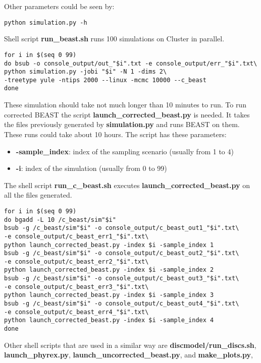 Other parameters could be seen by:

\begin{verbatim}
python simulation.py -h
\end{verbatim}


Shell script \textbf{run\_beast.sh} runs 100 simulations on Cluster in parallel.
\begin{verbatim}
for i in $(seq 0 99)
do bsub -o console_output/out_"$i".txt -e console_output/err_"$i".txt\
python simulation.py -jobi "$i" -N 1 -dims 2\
-treetype yule -ntips 2000 --linux -mcmc 10000 --c_beast
done
\end{verbatim}


These simulation should take not much longer than 10 minutes to run. To run corrected BEAST the script \textbf{launch\_corrected\_beast.py} is needed. It takes the files previously generated by \textbf{simulation.py} and runs BEAST on them. These runs could take about 10 hours. The script has these parameters:

\begin{itemize}
\item \textbf{-sample\_index}: index of the sampling scenario (usually from 1 to 4)
\item \textbf{-i}: index of the simulation (usually from 0 to 99)
\end{itemize}

The shell script \textbf{run\_c\_beast.sh} executes \textbf{launch\_corrected\_beast.py} on all the files generated.
\begin{verbatim}
for i in $(seq 0 99)
do bgadd -L 10 /c_beast/sim"$i"
bsub -g /c_beast/sim"$i" -o console_output/c_beast_out1_"$i".txt\
-e console_output/c_beast_err1_"$i".txt\ 
python launch_corrected_beast.py -index $i -sample_index 1
bsub -g /c_beast/sim"$i" -o console_output/c_beast_out2_"$i".txt\
-e console_output/c_beast_err2_"$i".txt\
python launch_corrected_beast.py -index $i -sample_index 2
bsub -g /c_beast/sim"$i" -o console_output/c_beast_out3_"$i".txt\
-e console_output/c_beast_err3_"$i".txt\
python launch_corrected_beast.py -index $i -sample_index 3
bsub -g /c_beast/sim"$i" -o console_output/c_beast_out4_"$i".txt\
-e console_output/c_beast_err4_"$i".txt\
python launch_corrected_beast.py -index $i -sample_index 4
done
\end{verbatim}

Other shell scripts that are used in a similar way are \textbf{discmodel/run\_discs.sh},  \textbf{launch\_phyrex.py}, \textbf{launch\_uncorrected\_beast.py}, and \textbf{make\_plots.py},

